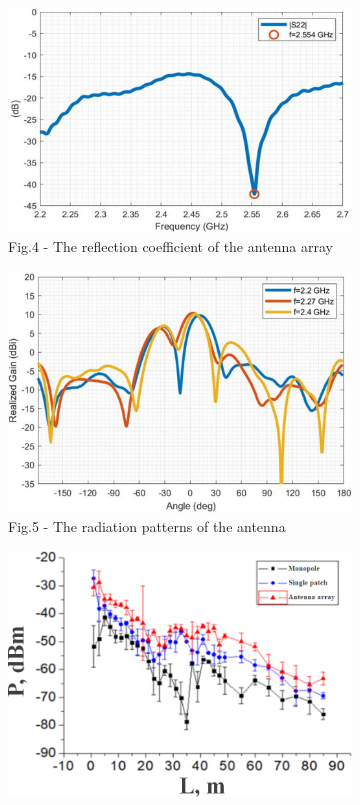 \begin{figure}[H]
   \centering
   \begin{subfigure}{0.49\textwidth}
   	\centering
   	\includegraphics[width=\textwidth]{media/ict/image44}
   	\caption*{Fig.4 - The reflection coefficient of the antenna array}
   \end{subfigure}
   \begin{subfigure}{0.45\textwidth}
   	\centering
   	\includegraphics[width=\textwidth]{media/ict/image45}
   	\caption*{Fig.5 - The radiation patterns of the antenna}
   \end{subfigure}
   \begin{subfigure}{0.5\textwidth}
       \centering
       \includegraphics[width=\textwidth]{media/ict/image46}

\end{subfigure}
\end{figure}
